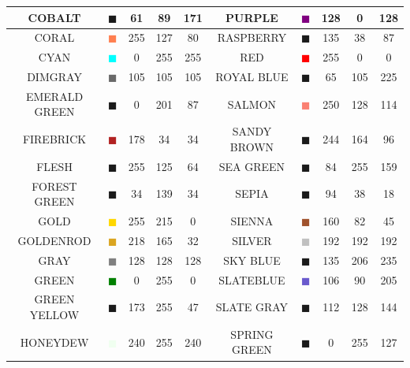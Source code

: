 \documentclass[11pt]{book}
\begin{document}
\begin{table}[p]
\begin{center}
\begin{tabular}{|c|c|c|c|c|c||c|c|c|c|}
{\ct COBALT} & \textcolor{COBALT} {$\blacksquare$} & 61& 89& 171& {\ct PURPLE} &  \textcolor{PURPLE} {$\blacksquare$} & 128& 0& 128  \\ \hline
{\ct CORAL} & \textcolor{CORAL} {$\blacksquare$} & 255& 127& 80& {\ct RASPBERRY} &  \textcolor{RASPBERRY} {$\blacksquare$} & 135& 38& 87  \\ \hline
{\ct CYAN} & \textcolor{CYAN} {$\blacksquare$} & 0& 255& 255& {\ct RED} &  \textcolor{RED} {$\blacksquare$} & 255& 0& 0  \\ \hline
{\ct DIMGRAY } & \textcolor{DIMGRAY } {$\blacksquare$} & 105& 105& 105& {\ct ROYAL BLUE} &  \textcolor{ROYAL BLUE} {$\blacksquare$} & 65& 105& 225  \\ \hline
{\ct EMERALD GREEN} & \textcolor{EMERALD GREEN} {$\blacksquare$} & 0& 201& 87& {\ct SALMON} &  \textcolor{SALMON} {$\blacksquare$} & 250& 128& 114  \\ \hline
{\ct FIREBRICK} & \textcolor{FIREBRICK} {$\blacksquare$} & 178& 34& 34& {\ct SANDY BROWN} &  \textcolor{SANDY BROWN} {$\blacksquare$} & 244& 164& 96  \\ \hline
{\ct FLESH} & \textcolor{FLESH} {$\blacksquare$} & 255& 125& 64& {\ct SEA GREEN} &  \textcolor{SEA GREEN} {$\blacksquare$} & 84& 255& 159  \\ \hline
{\ct FOREST GREEN} & \textcolor{FOREST GREEN} {$\blacksquare$} & 34& 139& 34& {\ct SEPIA} &  \textcolor{SEPIA} {$\blacksquare$} & 94& 38& 18  \\ \hline
{\ct GOLD } & \textcolor{GOLD } {$\blacksquare$} & 255& 215& 0& {\ct SIENNA} &  \textcolor{SIENNA} {$\blacksquare$} & 160& 82& 45  \\ \hline
{\ct GOLDENROD} & \textcolor{GOLDENROD} {$\blacksquare$} & 218& 165& 32& {\ct SILVER} &  \textcolor{SILVER} {$\blacksquare$} & 192& 192& 192  \\ \hline
{\ct GRAY} & \textcolor{GRAY} {$\blacksquare$} & 128& 128& 128& {\ct SKY BLUE} &  \textcolor{SKY BLUE} {$\blacksquare$} & 135& 206& 235  \\ \hline
{\ct GREEN} & \textcolor{GREEN} {$\blacksquare$} & 0& 255& 0& {\ct SLATEBLUE} &  \textcolor{SLATEBLUE} {$\blacksquare$} & 106& 90& 205  \\ \hline
{\ct GREEN YELLOW} & \textcolor{GREEN YELLOW} {$\blacksquare$} & 173& 255& 47& {\ct SLATE GRAY} &  \textcolor{SLATE GRAY} {$\blacksquare$} & 112& 128& 144  \\ \hline
{\ct HONEYDEW} & \textcolor{HONEYDEW} {$\blacksquare$} & 240& 255& 240& {\ct SPRING GREEN} &  \textcolor{SPRING GREEN} {$\blacksquare$} & 0& 255& 127  \\ \hline

\end{tabular}
\end{center}
\end{table}
\end{document}
